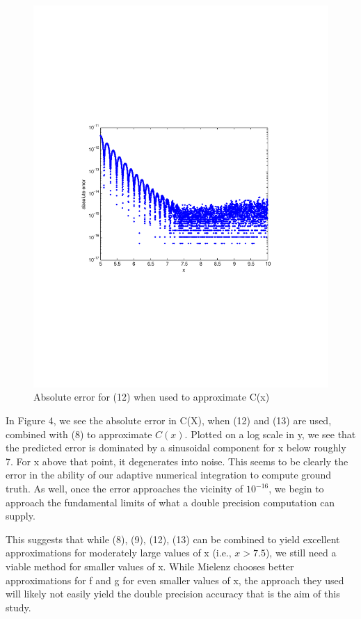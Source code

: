 \documentclass[a4paper,11pt]{article}
\begin{document}
\begin{figure}
\centering
    \includegraphics[width=5in]{associatedfgerrors.pdf}
        \caption{Absolute error for (12) when used to approximate C(x)}
\end{figure}

In Figure 4, we see the absolute error in C(X), when (12) and (13) are used, combined with (8) to approximate $C(x)$. Plotted on a log scale in y, we see that the predicted error is dominated by a sinusoidal component for x below roughly 7. For x above that point, it degenerates into noise. This seems to be clearly the error in the ability of our adaptive numerical integration to compute ground truth. As well, once the error approaches the vicinity of $10^{-16}$, we begin to approach the fundamental limits of what a double precision computation can supply.

This suggests that while (8), (9), (12), (13) can be combined to yield excellent approximations for moderately large values of x (i.e., $x > 7.5$), we still need a viable method for smaller values of x. While Mielenz chooses better approximations for f and g for even smaller values of x, the approach they used will likely not easily yield the double precision accuracy that is the aim of this study.
\end{document}
